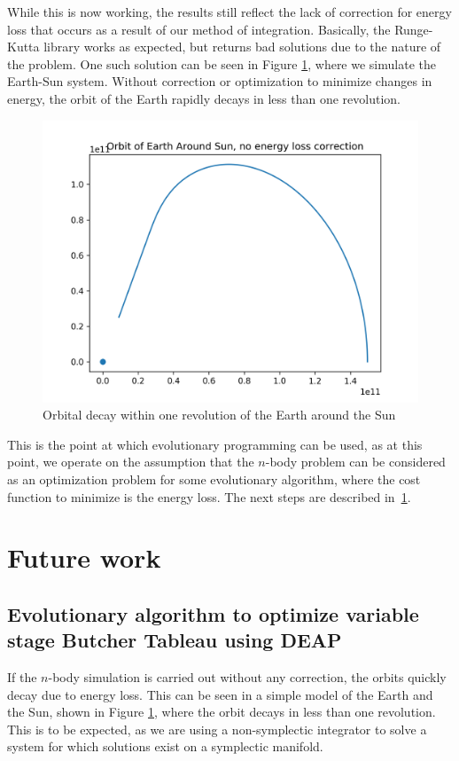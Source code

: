 \documentclass[onecolumn,titlepage,letterpaper,10pt]{article}
\begin{document}
While this is now working, the results still reflect the lack of correction for
energy loss that occurs as a result of our method of integration. Basically, the
Runge-Kutta library works as expected, but returns bad solutions due to the
nature of the problem. One such solution can be seen in Figure
\ref{fig:decayingorbits}, where we simulate the Earth-Sun system. Without
correction or optimization to minimize changes in energy, the orbit of the Earth
rapidly decays in less than one revolution.
%
\begin{figure}[ht!]
    \centering
    \includegraphics[width=0.5\linewidth]{images/decayingorbits.png}
    \caption{Orbital decay within one revolution of the Earth around the Sun}
    \label{fig:decayingorbits}
\end{figure}
%
This is the point at which evolutionary programming can
be used, as at this point, we operate on the assumption that the $n$-body
problem can be considered as an optimization problem for some evolutionary
algorithm, where the cost function to minimize is the energy loss.
The next steps are described in~\ref{sec:future}.


\section{Future work}\label{sec:future}
\subsection{Evolutionary algorithm to optimize variable stage Butcher Tableau using
    DEAP}

If the $n$-body simulation is carried out without any correction, the orbits
quickly decay due to energy loss. This can be seen in a simple model of the
Earth and the Sun, shown in Figure \ref{fig:decayingorbits},
where the orbit decays in less than one revolution. This is to be expected, as
we are using a non-symplectic integrator to solve a system for which solutions
exist on a symplectic manifold.
\end{document}
